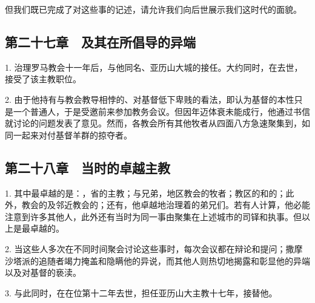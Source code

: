 但我们既已完成了对这些事的记述，请允许我们向后世展示我们这时代的面貌。\par


\subsection{第二十七章 及其在所倡导的异端}

1. 治理罗马教会十一年后，与他同名、亚历山大城的接任。大约同时，在去世，接受了该主教职位。\par

2. 由于他持有与教会教导相悖的、对基督低下卑贱的看法，即认为基督的本性只是一个普通人，于是受邀前来参加教务会议。但因年迈体衰未能成行，他通过书信就讨论的问题发表了意见。然而，各教会所有其他牧者从四面八方急速聚集到，如同一起来对付基督羊群的掠夺者。\par


\subsection{第二十八章 当时的卓越主教}

1. 其中最卓越的是：，省的主教；与兄弟，地区教会的牧者；教区的和的；此外，教会的及邻近教会的；还有，他卓越地治理着的弟兄们。若有人计算，他必能注意到许多其他人，此外还有当时为同一事由聚集在上述城市的司铎和执事。但以上是最卓越的。\par

2. 当这些人多次在不同时间聚会讨论这些事时，每次会议都在辩论和提问；撒摩沙塔派的追随者竭力掩盖和隐瞒他的异说，而其他人则热切地揭露和彰显他的异端以及对基督的亵渎。\par

3. 与此同时，在在位第十二年去世，担任亚历山大主教十七年，接替他。\par

